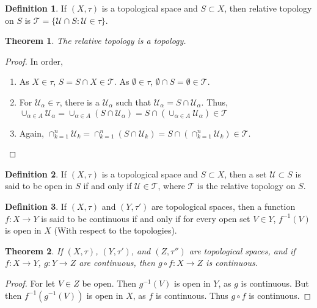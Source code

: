 \documentclass[oneside]{book}
\newtheorem{theorem}{Theorem}[section]
\theoremstyle{definition}
\newtheorem{definition}{Definition}[section]
\begin{document}
\begin{definition}
If $(X,\tau)$ is a topological space and $S\subset X$, then relative topology on $S$ is $\mathscr{T}=\{\mathcal{U}\cap S:\mathcal{U}\in \tau\}$.
\end{definition}

\begin{theorem}
The relative topology is a topology.
\end{theorem}
\begin{proof}
In order,
\begin{enumerate}
\item As $X\in \tau$, $S=S\cap X \in \mathscr{T}$. As $\emptyset\in \tau$, $\emptyset\cap S = \emptyset \in \mathscr{T}$. 
\item For $\mathscr{U}_\alpha\in \mathscr{\tau}$, there is a $\mathcal{U}_\alpha$ such that $\mathscr{U}_\alpha = S\cap \mathcal{U}_\alpha$. Thus, $\cup_{\alpha \in A} \mathscr{U}_\alpha = \cup_{\alpha \in A}(S\cap \mathcal{U}_\alpha) = S\cap (\cup_{\alpha \in A}\mathscr{U}_\alpha)\in \mathscr{T}$
\item Again, $\cap_{k=1}^{n} \mathscr{U}_k = \cap_{k=1}^{n}(S\cap \mathcal{U}_k) = S\cap (\cap_{k=1}^{n} \mathcal{U}_k)\in \mathscr{T}$.
\end{enumerate}
\end{proof}

\begin{definition}
If $(X,\tau)$ is a topological space and $S\subset X$, then a set $\mathcal{U}\subset S$ is said to be open in $S$ if and only if $\mathcal{U}\in \mathscr{T}$, where $\mathscr{T}$ is the relative topology on $S$.
\end{definition}

\begin{definition}
If $(X,\tau)$ and $(Y,\tau')$ are topological spaces, then a function $f:X\rightarrow Y$ is said to be continuous if and only if for every open set $V\in Y$, $f^{-1}(V)$ is open in $X$ (With respect to the topologies).
\end{definition}

\begin{theorem}
If $(X,\tau)$, $(Y,\tau')$, and $(Z,\tau'')$ are topological spaces, and if $f:X\rightarrow Y$, $g:Y\rightarrow Z$ are continuous, then $g\circ f:X\rightarrow Z$ is continuous. 
\end{theorem}
\begin{proof}
For let $V\in Z$ be open. Then $g^{-1}(V)$ is open in $Y$, as $g$ is continuous. But then $f^{-1}(g^{-1}(V))$ is open in $X$, as $f$ is continuous. Thus $g\circ f$ is continuous.
\end{proof}
\end{document}
